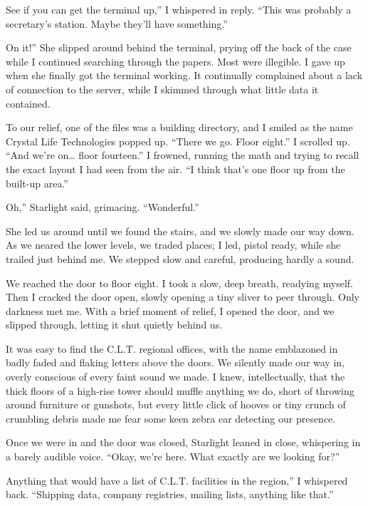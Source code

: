 \leavevmode{}See if you can get the terminal up,” I whispered in reply. “This was probably a secretary’s station. Maybe they’ll have something.”

\leavevmode{}On it!” She slipped around behind the terminal, prying off the back of the case while I continued searching through the papers. Most were illegible. I gave up when she finally got the terminal working. It continually complained about a lack of connection to the server, while I skimmed through what little data it contained.

To our relief, one of the files was a building directory, and I smiled as the name Crystal Life Technologies popped up. “There we go. Floor eight.” I scrolled up. “And we’re on… floor fourteen.” I frowned, running the math and trying to recall the exact layout I had seen from the air. “I think that’s one floor up from the built-up area.”

\leavevmode{}Oh,” Starlight said, grimacing. “Wonderful.”

She led us around until we found the stairs, and we slowly made our way down. As we neared the lower levels, we traded places; I led, pistol ready, while she trailed just behind me. We stepped slow and careful, producing hardly a sound.

We reached the door to floor eight. I took a slow, deep breath, readying myself. Then I cracked the door open, slowly opening a tiny sliver to peer through. Only darkness met me. With a brief moment of relief, I opened the door, and we slipped through, letting it shut quietly behind us.

It was easy to find the C.L.T. regional offices, with the name emblazoned in badly faded and flaking letters above the doors. We silently made our way in, overly conscious of every faint sound we made. I knew, intellectually, that the thick floors of a high-rise tower should muffle anything we do, short of throwing around furniture or gunshots, but every little click of hooves or tiny crunch of crumbling debris made me fear some keen zebra ear detecting our presence.

Once we were in and the door was closed, Starlight leaned in close, whispering in a barely audible voice. “Okay, we’re here. What exactly are we looking for?”

\leavevmode{}Anything that would have a list of C.L.T. facilities in the region,” I whispered back. “Shipping data, company registries, mailing lists, anything like that.”

